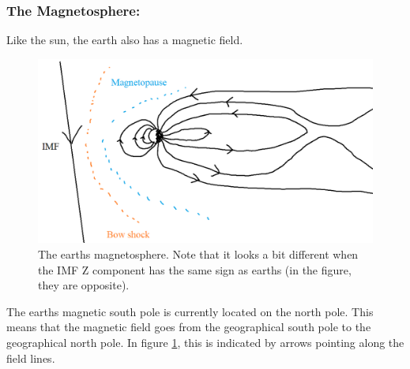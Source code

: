 \documentclass[norsk,a4paper,12pt]{article}
\begin{document}
\begin{multicols}{2}
	\subsubsection{The Magnetosphere:}
		Like the sun, the earth also has a magnetic field.
		\begin{figure}[H]
			\includegraphics[scale = 0.4]{Figures/magnetosphere.png}
			\centering
			\caption{The earths magnetosphere. Note that it looks a bit different when the IMF Z component has the same sign as earths (in the figure, they are opposite).}
			\label{fig::magnetopause}
		\end{figure}
	
	The earths magnetic south pole is currently located on the north pole. This means that the magnetic field goes from the geographical south pole to the 			geographical north pole. In figure \ref{fig::magnetopause}, this is indicated by arrows pointing along the field lines.


\end{multicols}
\end{document}
